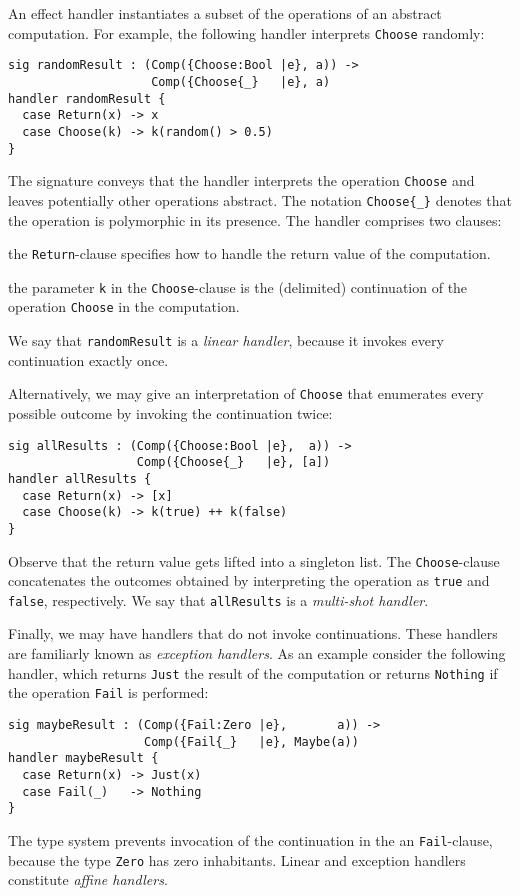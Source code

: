 \documentclass[preprint,numbers]{sigplanconf}
\begin{document}
An effect handler instantiates a subset of the operations of an
abstract computation. For example, the following handler interprets
\lstinline$Choose$ randomly:
\begin{lstlisting}
sig randomResult : (Comp({Choose:Bool |e}, a)) ->
                    Comp({Choose{_}   |e}, a)
handler randomResult {
  case Return(x) -> x
  case Choose(k) -> k(random() > 0.5)
}
\end{lstlisting}
The signature conveys that the handler interprets the operation
\lstinline$Choose$ and leaves potentially other operations
abstract. The notation \lstinline$Choose{_}$ denotes that the
operation is polymorphic in its presence.  The handler comprises two
clauses:
\begin{enumerate*}[label={\roman*)}]
\item the \lstinline$Return$-clause specifies how to handle the return
  value of the computation.
\item the parameter \lstinline$k$ in the \lstinline$Choose$-clause is
  the (delimited) continuation of the operation \lstinline$Choose$ in the
  computation.
\end{enumerate*}
We say that \lstinline$randomResult$ is a \emph{linear handler}, because
it invokes every continuation exactly once.

Alternatively, we may give an interpretation of \lstinline$Choose$
that enumerates every possible outcome by invoking the continuation
twice:
\begin{lstlisting}
sig allResults : (Comp({Choose:Bool |e},  a)) ->
                  Comp({Choose{_}   |e}, [a])
handler allResults {
  case Return(x) -> [x]
  case Choose(k) -> k(true) ++ k(false)
}
\end{lstlisting}
Observe that the return value gets lifted into a singleton list. The
\lstinline$Choose$-clause concatenates the outcomes obtained by
interpreting the operation as \lstinline$true$ and \lstinline$false$,
respectively. We say that \lstinline$allResults$ is a \emph{multi-shot
  handler}.

Finally, we may have handlers that do not invoke continuations. These
handlers are familiarly known as \emph{exception handlers}. As an
example consider the following handler, which returns
\lstinline$Just$ the result of the computation or returns
\lstinline$Nothing$ if the operation \lstinline$Fail$ is performed:
\begin{lstlisting}
sig maybeResult : (Comp({Fail:Zero |e},       a)) ->
                   Comp({Fail{_}   |e}, Maybe(a))
handler maybeResult {
  case Return(x) -> Just(x)
  case Fail(_)   -> Nothing
}
\end{lstlisting}
The type system prevents invocation of the continuation in the an
\lstinline$Fail$-clause, because the type \lstinline$Zero$ has zero
inhabitants. Linear and exception handlers constitute \emph{affine
  handlers}.
\end{document}
